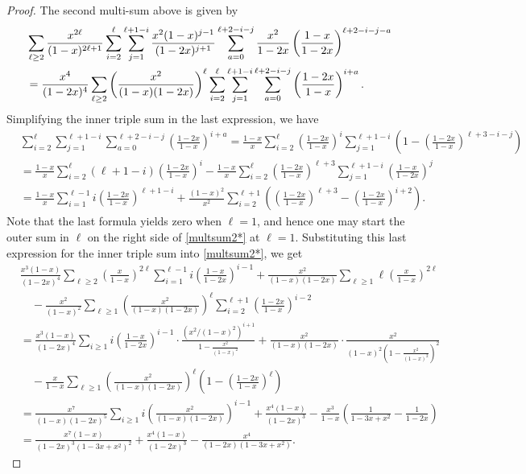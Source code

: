 \documentclass{article}
\theoremstyle{remark}
\theoremstyle{plain}
\begin{document}
\begin{proof}
The second multi-sum above is given by
\begin{align}
&\sum_{\ell \geq2}\frac{x^{2\ell}}{(1-x)^{2\ell+1}}\sum_{i=2}^\ell\sum_{j=1}^{\ell+1-i}\frac{x^2(1-x)^{j-1}}{(1-2x)^{j+1}}\sum_{a=0}^{\ell+2-i-j}\frac{x^2}{1-2x}\left(\frac{1-x}{1-2x}\right)^{\ell+2-i-j-a}\notag\\
&=\frac{x^4}{(1-2x)^4}\sum_{\ell \geq2}\left(\frac{x^2}{(1-x)(1-2x)}\right)^\ell\sum_{i=2}^\ell\sum_{j=1}^{\ell+1-i}\sum_{a=0}^{\ell+2-i-j}\left(\frac{1-2x}{1-x}\right)^{i+a}.\label{multsum2*}
\end{align}
Simplifying the inner triple sum in the last expression, we have
\begin{align*}
&\sum_{i=2}^\ell\sum_{j=1}^{\ell+1-i}\sum_{a=0}^{\ell+2-i-j}\left(\frac{1-2x}{1-x}\right)^{i+a}=\frac{1-x}{x}\sum_{i=2}^\ell\left(\frac{1-2x}{1-x}\right)^i\sum_{j=1}^{\ell+1-i}\left(1-\left(\frac{1-2x}{1-x}\right)^{\ell+3-i-j}\right)\\
&=\frac{1-x}{x}\sum_{i=2}^{\ell}(\ell+1-i)\left(\frac{1-2x}{1-x}\right)^i-\frac{1-x}{x}\sum_{i=2}^\ell\left(\frac{1-2x}{1-x}\right)^{\ell+3}\sum_{j=1}^{\ell+1-i}\left(\frac{1-x}{1-2x}\right)^j\\
&=\frac{1-x}{x}\sum_{i=1}^{\ell-1}i\left(\frac{1-2x}{1-x}\right)^{\ell+1-i}+\frac{(1-x)^2}{x^2}\sum_{i=2}^{\ell+1}\left(\left(\frac{1-2x}{1-x}\right)^{\ell+3}-\left(\frac{1-2x}{1-x}\right)^{i+2}\right).
\end{align*}
Note that the last formula yields zero when $\ell=1$, and hence one may start the outer sum in $\ell$ on the right side of \eqref{multsum2*} at $\ell=1$.  Substituting this last expression for the inner triple sum into \eqref{multsum2*}, we get
\begin{align*}
&\frac{x^3(1-x)}{(1-2x)^4}\sum_{\ell \geq2}\left(\frac{x}{1-x}\right)^{2\ell}\sum_{i=1}^{\ell-1}i\left(\frac{1-x}{1-2x}\right)^{i-1}+\frac{x^2}{(1-x)(1-2x)}\sum_{\ell\geq1}\ell\left(\frac{x}{1-x}\right)^{2\ell}\\
&\quad-\frac{x^2}{(1-x)^2}\sum_{\ell\geq1}\left(\frac{x^2}{(1-x)(1-2x)}\right)^\ell\sum_{i=2}^{\ell+1}\left(\frac{1-2x}{1-x}\right)^{i-2}\\
&=\frac{x^3(1-x)}{(1-2x)^4}\sum_{i\geq1}i\left(\frac{1-x}{1-2x}\right)^{i-1}\cdot\frac{(x^2/(1-x)^2)^{i+1}}{1-\frac{x^2}{(1-x)^2}}+\frac{x^2}{(1-x)(1-2x)}\cdot\frac{x^2}{(1-x)^2\left(1-\frac{x^2}{(1-x)^2}\right)^2}\\
&\quad-\frac{x}{1-x}\sum_{\ell \geq1}\left(\frac{x^2}{(1-x)(1-2x)}\right)^\ell\left(1-\left(\frac{1-2x}{1-x}\right)^\ell\right)\\
&=\frac{x^7}{(1-x)(1-2x)^5}\sum_{i\geq1}i\left(\frac{x^2}{(1-x)(1-2x)}\right)^{i-1}+\frac{x^4(1-x)}{(1-2x)^3}-\frac{x^3}{1-x}\left(\frac{1}{1-3x+x^2}-\frac{1}{1-2x}\right)\\
&=\frac{x^7(1-x)}{(1-2x)^3(1-3x+x^2)^2}+\frac{x^4(1-x)}{(1-2x)^3}-\frac{x^4}{(1-2x)(1-3x+x^2)}.
\end{align*}


\end{proof}
\end{document}
